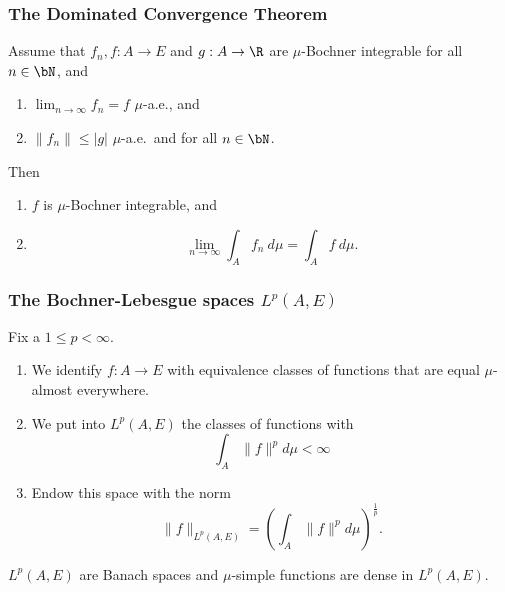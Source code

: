 \begin{frame}
    \frametitle{The Dominated Convergence Theorem}
    
    Assume that $f_n, f: A\to E$ and $g: A\to \R$ are $\mu$-Bochner integrable 
    for all $n\in\bN$, and 
    \begin{enumerate}
        \item $\lim_{n\to \infty} f_n = f$ $\mu$-a.e., and 
        \item $\| f_n  \| \leq |g|$ $\mu$-a.e.\ and for all $n\in\bN$.  
    \end{enumerate} 
    Then
    \begin{enumerate}
        \item $f$ is $\mu$-Bochner integrable, and 
        \item \begin{equation*}
                \lim_{n\to\infty} \int_{A}^{} f_n \ d\mu = \int_{A}^{} f \ d\mu.
            \end{equation*}
    \end{enumerate}
\end{frame}


\begin{frame}
    \frametitle{The Bochner-Lebesgue spaces $L^p(A, E)$}

    Fix a $1 \leq p < \infty$. 
    
    \begin{enumerate}
        \item We identify $f: A\to E$ with equivalence classes of functions that
            are equal $\mu$-almost everywhere. 
        \item We put into $L^p(A,E)$ the classes of functions with
            \begin{equation*}
                \int_{A}^{} \| f \|^p d\mu < \infty
            \end{equation*}
        \item Endow this space with the norm
            \begin{equation*}
                \| f \|_{L^p(A,E)} = \left( \int_{A}^{} \| f \|^p d\mu \right)^{\frac{1}{p}}.
            \end{equation*}
    \end{enumerate}

    $L^p(A,E)$ are Banach spaces and $\mu$-simple functions are dense in $L^p(A,E)$. 
\end{frame}





